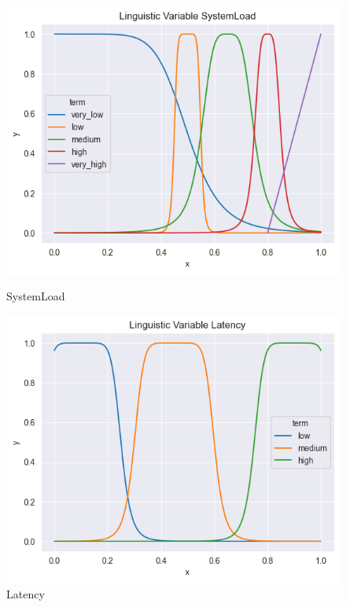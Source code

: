 \documentclass[titlepage]{article}
\begin{document}
\begin{figure}[htbp]
    \centering
    \begin{minipage}{0.32\textwidth}
        \centering
        \includegraphics[width=\textwidth]{../images/bell_v9/SystemLoad}
        \caption{SystemLoad}
        \label{fig:bellv9_processor_load}
    \end{minipage}
    \hfill
    \begin{minipage}{0.32\textwidth}
        \centering
        \includegraphics[width=\textwidth]{../images/bell_v9/Latency}
        \caption{Latency}
        \label{fig:bellv9_memory_usage}

\end{minipage}
\end{figure}
\end{document}
